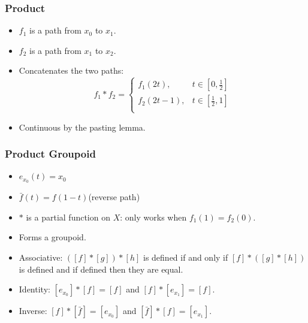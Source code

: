 \documentclass{beamer}
\begin{document}
\begin{frame}
  \frametitle{Product}
  \begin{itemize}
  \item \(f_1\) is a path from \(x_0\) to \(x_1\).
  \item \(f_2\) is a path from \(x_1\) to \(x_2\).
  \item Concatenates the two paths:
    \[f_1*f_2=\begin{cases}
    f_1(2t), & t\in\left[0,\frac{1}{2}\right] \\
    f_2(2t-1), & t\in\left[\frac{1}{2},1\right] \\
    \end{cases}\]
  \item Continuous by the pasting lemma.

    \bigskip

    \begin{center}
    \end{center}
  \end{itemize}
\end{frame}

\begin{frame}
  \frametitle{Product Groupoid}
  \begin{itemize}
  \item \(e_{x_0}(t)=x_0\)
  \item \(\bar{f}(t)=f(1-t)\)\qquad(reverse path)
  \item \(*\) is a partial function on \(X\): only works when \(f_1(1)=f_2(0)\).
  \item Forms a groupoid.
  \item Associative: \(([f]*[g])*[h]\) is defined if and only if \([f]*([g]*[h])\) is defined and if defined then
    they are equal.
  \item Identity: \([e_{x_0}]*[f]=[f]\) and \([f]*[e_{x_1}]=[f]\).
  \item Inverse: \([f]*[\bar{f}]=[e_{x_0}]\) and \([\bar{f}]*[f]=[e_{x_1}]\).
  \end{itemize}
\end{frame}
\end{document}
